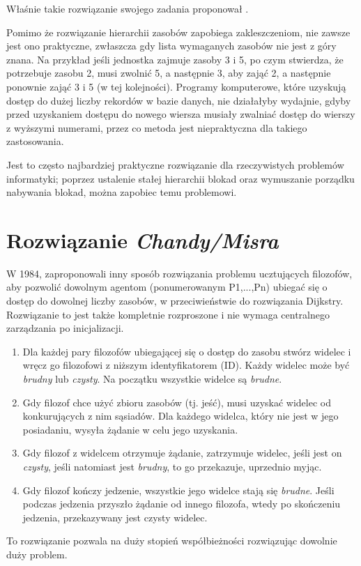 \documentclass[a4paper, 12pt]{report}
\begin{document}
Właśnie takie rozwiązanie swojego zadania proponował \textcite{dijkstra}.

Pomimo że rozwiązanie hierarchii zasobów zapobiega zakleszczeniom, nie zawsze jest ono praktyczne, zwłaszcza gdy lista wymaganych zasobów nie jest z góry znana. Na przykład jeśli jednostka zajmuje zasoby 3 i 5, po czym stwierdza, że potrzebuje zasobu 2, musi zwolnić 5, a następnie 3, aby zająć 2, a następnie ponownie zająć 3 i 5 (w tej kolejności). Programy komputerowe, które uzyskują dostęp do dużej liczby rekordów w bazie danych, nie działałyby wydajnie, gdyby przed uzyskaniem dostępu do nowego wiersza musiały zwalniać dostęp do wierszy z wyższymi numerami, przez co metoda jest niepraktyczna dla takiego zastosowania.

Jest to często najbardziej praktyczne rozwiązanie dla rzeczywistych problemów informatyki; poprzez ustalenie stałej hierarchii blokad oraz wymuszanie porządku nabywania blokad, można zapobiec temu problemowi.

\section{Rozwiązanie \emph{Chandy/Misra}}

W 1984, \textcite{chandy_misra} zaproponowali inny sposób rozwiązania problemu ucztujących filozofów, aby pozwolić dowolnym agentom (ponumerowanym P1,...,Pn) ubiegać się o dostęp do dowolnej liczby zasobów, w przeciwieństwie do rozwiązania Dijkstry. Rozwiązanie to jest także kompletnie rozproszone i nie wymaga centralnego zarządzania po inicjalizacji.

\begin{enumerate}
\item Dla każdej pary filozofów ubiegającej się o dostęp do zasobu stwórz widelec i wręcz go filozofowi z niższym identyfikatorem (ID). Każdy widelec może być \emph{brudny} lub \emph{czysty}. Na początku wszystkie widelce są \emph{brudne}.
\item Gdy filozof chce użyć zbioru zasobów (tj. jeść), musi uzyskać widelec od konkurujących z nim sąsiadów. Dla każdego widelca, który nie jest w jego posiadaniu, wysyła żądanie w celu jego uzyskania.
\item Gdy filozof z widelcem otrzymuje żądanie, zatrzymuje widelec, jeśli jest on \emph{czysty}, jeśli natomiast jest \emph{brudny}, to go przekazuje, uprzednio myjąc.
\item Gdy filozof kończy jedzenie, wszystkie jego widelce stają się \emph{brudne}. Jeśli podczas jedzenia przyszło żądanie od innego filozofa, wtedy po skończeniu jedzenia, przekazywany jest czysty widelec.
\end{enumerate}
To rozwiązanie pozwala na duży stopień współbieżności rozwiązując dowolnie duży problem.
\end{document}
